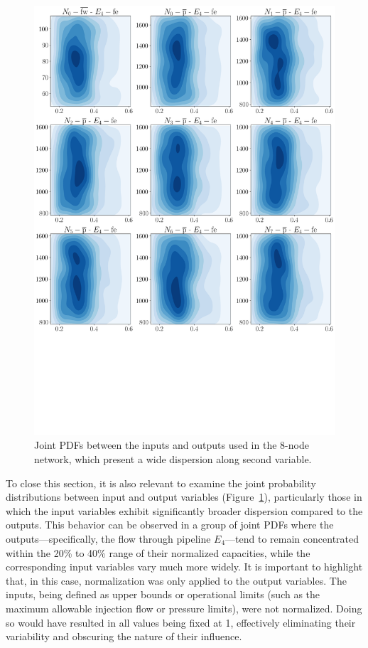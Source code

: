 \begin{figure}
    \begin{center}
        \includegraphics[width=.65\textwidth]{figures/Chapter_NonLinealCensnet/inputs_outputs_1.png}
    \end{center}
    \caption{Joint PDFs between the inputs and outputs used in the 8-node network, which present a wide dispersion along second variable. }
    \label{fig:joint_distributions_inputs_outputs_1}
\end{figure}

To close this section, it is also relevant to examine the joint probability distributions between input and output variables (Figure~\cref{fig:joint_distributions_inputs_outputs_1}), particularly those in which the input variables exhibit significantly broader dispersion compared to the outputs. This behavior can be observed in a group of joint PDFs where the outputs—specifically, the flow through pipeline $E_4$—tend to remain concentrated within the 20\% to 40\% range of their normalized capacities, while the corresponding input variables vary much more widely. It is important to highlight that, in this case, normalization was only applied to the output variables. The inputs, being defined as upper bounds or operational limits (such as the maximum allowable injection flow or pressure limits), were not normalized. Doing so would have resulted in all values being fixed at 1, effectively eliminating their variability and obscuring the nature of their influence.


